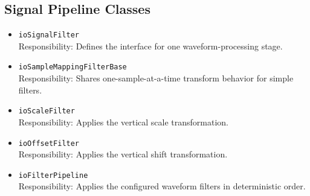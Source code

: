     \subsection{Signal Pipeline Classes}
    \begin{itemize}
        \item \texttt{ioSignalFilter} \\
        Responsibility: Defines the interface for one waveform-processing stage.

        \item \texttt{ioSampleMappingFilterBase} \\
        Responsibility: Shares one-sample-at-a-time transform behavior for simple filters.

        \item \texttt{ioScaleFilter} \\
        Responsibility: Applies the vertical scale transformation.

        \item \texttt{ioOffsetFilter} \\
        Responsibility: Applies the vertical shift transformation.

        \item \texttt{ioFilterPipeline} \\
        Responsibility: Applies the configured waveform filters in deterministic order.
    \end{itemize}

